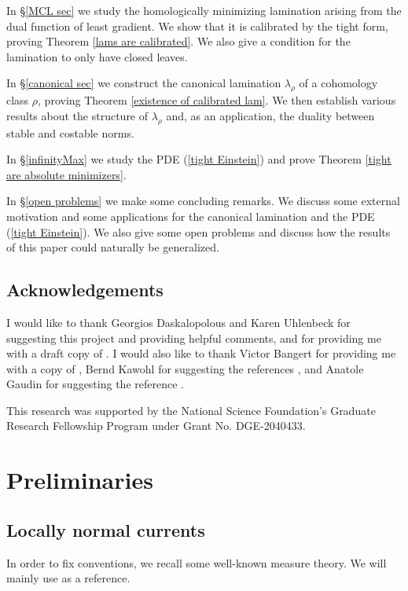 \documentclass[reqno,11pt]{amsart}
\theoremstyle{definition}
\numberwithin{equation}{section}
\begin{document}
In \S\ref{MCL sec} we study the homologically minimizing lamination arising from the dual function of least gradient. We show that it is calibrated by the tight form, proving Theorem \ref{lams are calibrated}. We also give a condition for the lamination to only have closed leaves.

In \S\ref{canonical sec} we construct the canonical lamination $\lambda_\rho$ of a cohomology class $\rho$, proving Theorem \ref{existence of calibrated lam}. We then establish various results about the structure of $\lambda_\rho$ and, as an application, the duality between stable and costable norms.

In \S\ref{infinityMax} we study the PDE (\ref{tight Einstein}) and prove Theorem \ref{tight are absolute minimizers}.

In \S\ref{open problems} we make some concluding remarks. We discuss some external motivation and some applications for the canonical lamination and the PDE (\ref{tight Einstein}). We also give some open problems and discuss how the results of this paper could naturally be generalized.

\subsection{Acknowledgements}
I would like to thank Georgios Daskalopolous and Karen Uhlenbeck for suggesting this project and providing helpful comments, and for providing me with a draft copy of \cite{daskalopoulos2023}.
I would also like to thank Victor Bangert for providing me with a copy of \cite{Auer12}, Bernd Kawohl for suggesting the references \cite{Kawohl2003, Grieser05}, and Anatole Gaudin for suggesting the reference \cite{Costabel2010}.

This research was supported by the National Science Foundation's Graduate Research Fellowship Program under Grant No. DGE-2040433.


\section{Preliminaries}\label{prevResults}
\subsection{Locally normal currents}
In order to fix conventions, we recall some well-known measure theory.
We will mainly use \cite{simon1983GMT} as a reference.
\end{document}
